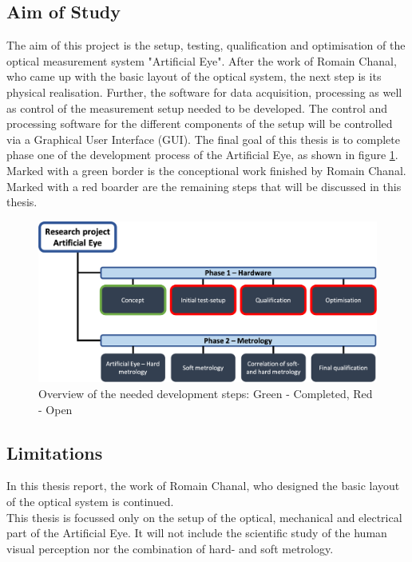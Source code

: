 \subsection{Aim of Study}
The aim of this project is the setup, testing, qualification and optimisation of the optical measurement system "Artificial Eye". After the work of Romain Chanal, who came up with the basic layout of the optical system, the next step is its physical realisation. Further, the software for data acquisition, processing as well as control of the measurement setup needed to be developed. The control and processing software for the different components of the setup will be controlled via a Graphical User Interface (GUI). The final goal of this thesis is to complete phase one of the development process of the Artificial Eye, as shown in figure \ref{ChainIni}. Marked with a green border is the conceptional work finished by Romain Chanal. Marked with a red boarder are the remaining steps that will be discussed in this thesis.

\begin{figure}[h]
\begin{center}
\includegraphics[width=12cm]{Pictures/ChainIntro}
\caption[Overview of the needed development steps]{Overview of the needed development steps: Green - Completed, Red - Open}
\label{ChainIni}
\end{center}
\end{figure}

\newpage
\subsection{Limitations}
In this thesis report, the work of Romain Chanal, who designed the basic layout of the optical system is continued.\\
This thesis is focussed only on the setup of the optical, mechanical and electrical part of the Artificial Eye. It will not include the scientific study of the human visual perception nor the combination of hard- and soft metrology. 






















